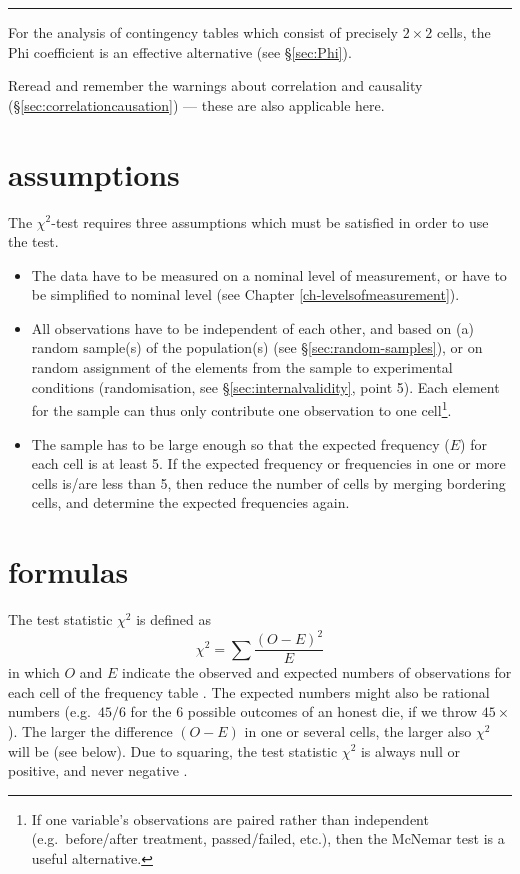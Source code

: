 \documentclass[
]{book}
\begin{document}
\begin{center}\rule{0.5\linewidth}{0.5pt}\end{center}

For the analysis of contingency tables which consist of precisely
\(2\times2\) cells, the Phi coefficient is an effective alternative
(see §\ref{sec:Phi}).

Reread and remember the warnings about correlation and causality
(§\ref{sec:correlationcausation})
--- these are also applicable here.

\section{assumptions}\label{sec:chi2test-assumptions}

The \(\chi^2\)-test requires three assumptions which must be satisfied
in order to use the test.

\begin{itemize}
\item
  The data have to be measured on a nominal level of measurement, or have
  to be simplified to nominal level (see Chapter \ref{ch-levelsofmeasurement}).
\item
  All observations have to be independent of each other, and based
  on (a) random sample(s) of the population(s) (see
  §\ref{sec:random-samples}), or on random assignment of the elements
  from the sample to experimental conditions (randomisation, see
  §\ref{sec:internalvalidity}, point 5). Each element for the sample can thus only
  contribute one observation to one cell\footnote{If one variable's observations are paired rather than independent (e.g.~before/after treatment, passed/failed, etc.), then the McNemar test is a useful alternative.}.
\item
  The sample has to be large enough so that the expected frequency
  (\(E\)) for each cell is at least 5. If the expected frequency or frequencies
  in one or more cells is/are less than 5, then reduce the number
  of cells by merging bordering cells, and determine the expected
  frequencies again.
\end{itemize}

\section{formulas}\label{formulas-6}

The test statistic \(\chi^2\) is defined as
\begin{equation}
  \label{eq:chisquared}
    \chi^2 = \sum \frac{(O-E)^2}{E}
\end{equation}
in which \(O\) and \(E\) indicate the observed and expected numbers of observations for each cell of the frequency table \citep{Ferg89}. The expected
numbers might also be rational numbers (e.g.~\(45/6\) for the 6 possible
outcomes of an honest die, if we throw
\(45\times\)). The larger the difference \((O-E)\) in one or several cells,
the larger also \(\chi^2\) will be (see below). Due to squaring, the test
statistic \(\chi^2\) is always null or positive, and never negative
\citep{Ferg89}.
\end{document}

